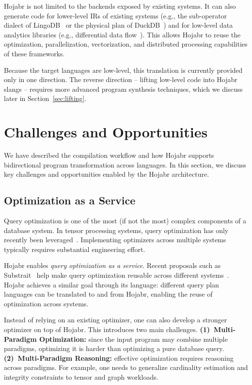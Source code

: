 \documentclass[sigconf,nonacm]{acmart}
\begin{document}
Hojabr is not limited to the backends exposed by existing systems. It can also generate code for lower-level IRs of existing systems (e.g., the sub-operator dialect of LingoDB~\cite{jungmair2023declarative} or the physical plan of DuckDB~\cite{raasveldt2019duckdb}) and for low-level data analytics libraries (e.g., differential data flow~\cite{mcsherry2013differential}). This allows Hojabr to reuse the optimization, parallelization, vectorization, and distributed processing capabilities of these frameworks.

Because the target languages are low-level, this translation is currently provided only in one direction. The reverse direction -- lifting low-level code into Hojabr slangs -- requires more advanced program synthesis techniques, which we discuss later in Section~\ref{sec:lifting}.


\section{Challenges and Opportunities}
\label{sec:challenges}
We have described the compilation workflow and how Hojabr supports bidirectional program transformation across languages. 
In this section, we discuss key challenges and opportunities enabled by the Hojabr architecture.



\subsection{Optimization as a Service}
\label{sec:queryoptsas}
Query optimization is one of the most (if not the most) complex components of a database system. In tensor processing systems, query optimization has only recently been leveraged~\cite {deeds2025galley}. Implementing optimizers across multiple systems typically requires substantial engineering effort.

Hojabr enables \emph{query optimization as a service}. Recent proposals such as Substrait~\cite{nadeau2022substrait} help make query optimization reusable across different systems~\cite{pedreira2023composable,alotaibi2024towards}. Hojabr achieves a similar goal through its language: different query plan languages can be translated to and from Hojabr, enabling the reuse of optimization across systems.

Instead of relying on an existing optimizer, one can also develop a stronger optimizer on top of Hojabr. This introduces two main challenges. \textbf{(1)~Multi-Paradigm Optimization:} since the input program may combine multiple paradigms, optimizing it is harder than optimizing a pure database query. \textbf{(2)~Multi-Paradigm Reasoning:} effective optimization requires reasoning across paradigms. For example, one needs to generalize cardinality estimation and integrity constraints to tensor and graph workloads.
\end{document}

